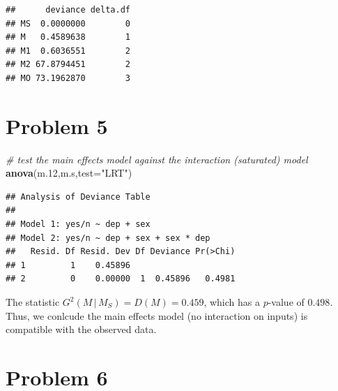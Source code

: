 \documentclass[
  11pt,
]{article}
\newenvironment{Shaded}{\begin{snugshade}}{\end{snugshade}}
\newcommand{\AttributeTok}[1]{\textcolor[rgb]{0.13,0.29,0.53}{#1}}
\newcommand{\CommentTok}[1]{\textcolor[rgb]{0.56,0.35,0.01}{\textit{#1}}}
\newcommand{\FloatTok}[1]{\textcolor[rgb]{0.00,0.00,0.81}{#1}}
\newcommand{\FunctionTok}[1]{\textcolor[rgb]{0.13,0.29,0.53}{\textbf{#1}}}
\newcommand{\NormalTok}[1]{#1}
\newcommand{\StringTok}[1]{\textcolor[rgb]{0.31,0.60,0.02}{#1}}
\begin{document}
\begin{verbatim}
##      deviance delta.df
## MS  0.0000000        0
## M   0.4589638        1
## M1  0.6036551        2
## M2 67.8794451        2
## MO 73.1962870        3
\end{verbatim}

\hypertarget{problem-5}{%
\section{Problem 5}\label{problem-5}}


\begin{Shaded}
\begin{Highlighting}[]
\CommentTok{\# test the main effects model against the interaction (saturated) model}
\FunctionTok{anova}\NormalTok{(m}\FloatTok{.12}\NormalTok{,m.s,}\AttributeTok{test=}\StringTok{"LRT"}\NormalTok{)}
\end{Highlighting}
\end{Shaded}

\begin{verbatim}
## Analysis of Deviance Table
## 
## Model 1: yes/n ~ dep + sex
## Model 2: yes/n ~ dep + sex + sex * dep
##   Resid. Df Resid. Dev Df Deviance Pr(>Chi)
## 1         1    0.45896                     
## 2         0    0.00000  1  0.45896   0.4981
\end{verbatim}

The statistic \(G^2(M\,|\,M_S) = D(M) = 0.459\), which has a \(p\)-value
of \(0.498\). Thus, we conlcude the main effects model (no interaction
on inputs) is compatible with the observed data.

\hypertarget{problem-6}{%
\section{Problem 6}\label{problem-6}}

\end{document}

